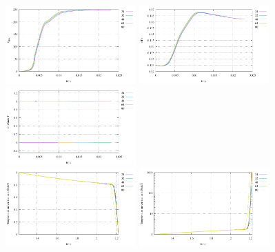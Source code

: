 \begin{center}
\includegraphics[width=5cm]{python_codes/fieldstone_106/results/axi/vrms3}
\includegraphics[width=5cm]{python_codes/fieldstone_106/results/axi/Tavrg3}
\includegraphics[width=5cm]{python_codes/fieldstone_106/results/axi/stats_T3}\\
\includegraphics[width=5cm]{python_codes/fieldstone_106/results/axi/profile_T3}
\includegraphics[width=5cm]{python_codes/fieldstone_106/results/axi/profile_eta3}
\end{center}


